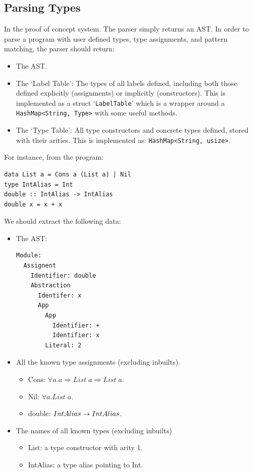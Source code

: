 \subsection{Parsing Types}
In the proof of concept system. The parser simply returns an AST. In order to parse a program with user defined types, type assignments, and pattern matching, the parser should return:
\begin{itemize}
    \item The AST.
    \item The `Label Table': The types of all labels defined, including both those defined explicitly (assignments) or implicitly (constructors). This is implemented as a struct `\verb|LabelTable|' which is a wrapper around a \verb|HashMap<String, Type>| with some useful methods. 
    \item The `Type Table': All type constructors and concrete types defined, stored with their arities. This is implemented as: \verb|HashMap<String, usize>|.
\end{itemize}
For instance, from the program:
\begin{lstlisting}[language=SFL_noprelude]
data List a = Cons a (List a) | Nil
type IntAlias = Int
double :: IntAlias -> IntAlias
double x = x + x	
\end{lstlisting}
We should extract the following data:
\begin{itemize}
    \item The AST: 
    \begin{lstlisting}[]
Module:
  Assignent
    Identifier: double
    Abstraction
      Identifer: x
      App
        App
          Identifier: +
          Identifier: x
        Literal: 2
    \end{lstlisting}
    \item All the known type assignments (excluding inbuilts).
        \begin{itemize}
            \item Cons: \(\forall a. a \Rightarrow List\;a\Rightarrow List\;a\).
            \item Nil: \(\forall a. List\;a\).
            \item double: \(IntAlias \rightarrow IntAlias\).
        \end{itemize}
    \item The names of all known types (excluding inbuilts) 
        \begin{itemize}
            \item List: a type constructor with arity 1.
            \item IntAlias: a type alias pointing to Int.
        \end{itemize}
\end{itemize}

